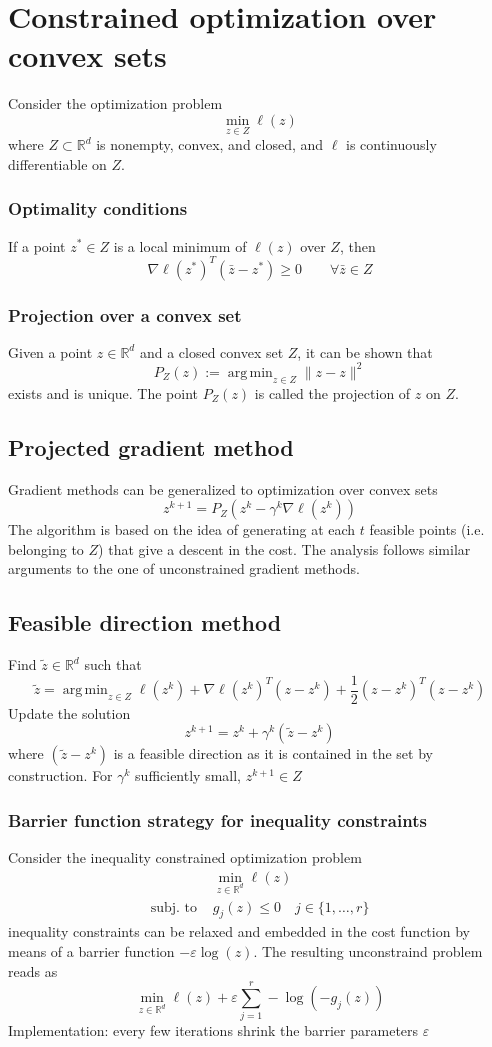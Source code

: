 \documentclass[openany]{book}
\DeclareMathOperator*{\argmin}{arg\,min} %
\newcommand{\R}{\mathbb{R}} %
\theoremstyle{definition}
\theoremstyle{remark}
\begin{document}
\section{Constrained optimization over convex sets}
Consider the optimization problem 
\[
    \min_{z\in Z}\ell(z)
\]
where $Z \subset \R^d$ is nonempty, convex, and closed, and $\ell$ is continuously differentiable on $Z$. 
\subsubsection{Optimality conditions}
If a point $z^* \in Z$ is a local minimum of $\ell(z)$ over $Z$, then 
\[
    \nabla\ell(z^*)^T(\bar{z}-z^*)\geq 0 \qquad \forall\bar{z}\in Z
\]
\subsubsection{Projection over a convex set}
Given a point $z\in\R^d$ and a closed convex set $Z$, it can be shown that 
\[
    P_Z(z) := \argmin_{z\in Z}\|z-z\|^2
\]
exists and is unique. The point $P_Z(z)$ is called the projection of $z$ on $Z$.
\subsection{Projected gradient method}
Gradient methods can be generalized to optimization over convex sets 
\[
    z^{k+1}=P_Z(z^k-\gamma^k\nabla\ell(z^k))
\]
The algorithm is based on the idea of generating at each $t$ feasible points (i.e. belonging to $Z$) that give a descent in the cost. The analysis follows similar arguments to the one of unconstrained gradient methods.

\subsection{Feasible direction method}
Find $\tilde{z}\in\R^d$ such that 
\[
    \tilde{z} = \argmin_{z\in Z} \ell(z^k)+\nabla\ell(z^k)^T(z-z^k)+\displaystyle\frac{1}{2}(z-z^k)^T(z-z^k)
\]
Update the solution 
\[
    z^{k+1}=z^k+\gamma^k(\tilde{z}-z^k)
\]
where $(\tilde{z}-z^k)$ is a feasible direction as it is contained in the set by construction. For $\gamma^k$ sufficiently small, $z^{k+1}\in Z$

\subsubsection{Barrier function strategy for inequality constraints}
Consider the inequality constrained optimization problem 
\begin{align*}
    &\min_{z\in\R^d}\ell(z)\\
    \text{subj. to } &g_j(z)\leq 0 \quad j\in \{1,\dots,r\}
\end{align*}  
inequality constraints can be relaxed and embedded in the cost function by means of a barrier function $-\varepsilon \log(z)$. The resulting unconstraind problem reads as 
\[
    \min_{z\in\R^d} \ell(z) + \varepsilon \displaystyle\sum_{j=1}^{r}-\log(-g_j(z))
\]
Implementation: every few iterations shrink the barrier parameters $\varepsilon$
\end{document}
